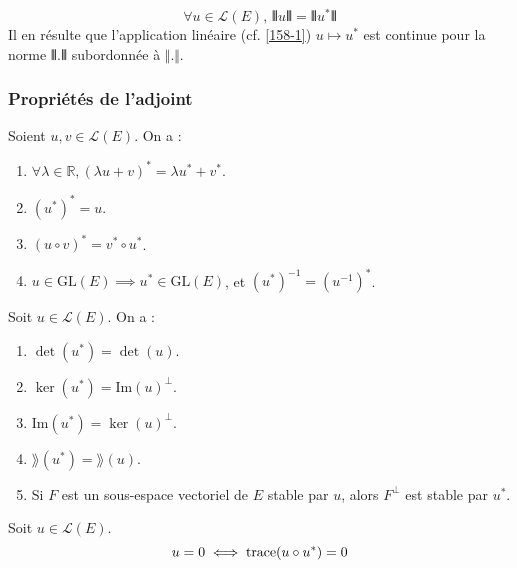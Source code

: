   \begin{proposition}
    \[ \forall u \in \mathcal{L}(E), \, \VERT u \VERT = \VERT u^* \VERT \]
    Il en résulte que l'application linéaire (cf. \cref{158-1}) $u \mapsto u^*$ est continue pour la norme $\VERT . \VERT$ subordonnée à $\Vert . \Vert$.
  \end{proposition}

  \subsubsection{Propriétés de l'adjoint}


  \begin{proposition}
    \label{158-1}
    Soient $u, v \in \mathcal{L}(E)$. On a :
    \begin{enumerate}[label=(\roman*)]
      \item $\forall \lambda \in \mathbb{R}, (\lambda u + v)^* = \lambda u^* + v^*$.
      \item $(u^*)^* = u$.
      \item $(u \circ v)^* = v^* \circ u^*$.
      \item $u \in \mathrm{GL}(E) \implies u^* \in \mathrm{GL}(E)$, et $(u^*)^{-1} = (u^{-1})^*$.
    \end{enumerate}
  \end{proposition}

  \begin{proposition}
    Soit $u \in \mathcal{L}(E)$. On a :
    \begin{enumerate}[label=(\roman*)]
      \item $\det(u^*) = \det(u)$.
      \item $\ker(u^*) = \mathrm{Im}(u)^\perp$.
      \item $\mathrm{Im}(u^*) = \ker(u)^\perp$.
      \item $\rang(u^*) = \rang(u)$.
      \item Si $F$ est un sous-espace vectoriel de $E$ stable par $u$, alors $F^\perp$ est stable par $u^*$.
    \end{enumerate}
  \end{proposition}


  \begin{proposition}
    Soit $u \in \mathcal{L}(E)$.
    \[ u = 0 \iff \operatorname{trace}(u \circ u^*) = 0 \]
  \end{proposition}

